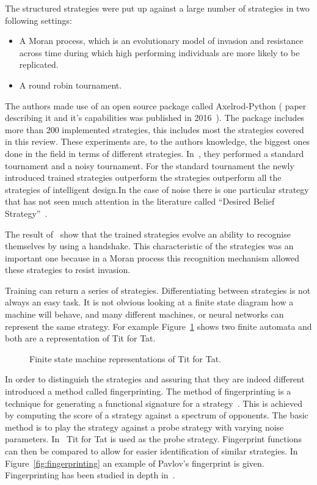 \documentclass{article}
\theoremstyle{definition}
\begin{document}
The structured strategies were put up against a large number of strategies in
two following settings:

\begin{itemize}
    \item A Moran process, which is an evolutionary model of invasion and resistance across
    time during which high performing individuals are more likely to be replicated.
    \item A round robin tournament.
\end{itemize}

The authors made use of an open source package called Axelrod-Python
( paper describing it and it's capabilities was published in 2016~\cite{Knight2016}).
The package includes more than 200 implemented strategies, this includes most
the strategies covered in this review.
These experiments are, to the authors knowledge, the biggest ones done in the
field in terms of different strategies.
In~\cite{Knight2017}, they performed a standard tournament and a noisy tournament.
For the standard tournament the newly introduced trained
strategies outperform the strategies outperform all the strategies of intelligent
design.In the case of noise there is one particular strategy that has not seen much
attention in the literature called ``Desired Belief Strategy''~\cite{Au2006}.

The result of~\cite{KnightHGC17} show that the trained strategies evolve an ability
to recognise themselves by using a handshake. This characteristic of the strategies
was an important one because in a Moran process this recognition mechanism allowed these
strategies to resist invasion.

Training can return a series of strategies. Differentiating between strategies
is not always an easy task. It is not obvious looking at a finite state diagram
how a machine will behave, and many different machines, or neural networks can
represent the same strategy. For example Figure~\ref{fig:machine_tft} shows
two finite automata and both are a representation of Tit for Tat.

\begin{figure}[!hbtp]
    \centering
    
    \caption{Finite state machine representations of Tit for Tat.}\label{fig:machine_tft}
\end{figure}

In order to distinguish the strategies and assuring that they are indeed
different~\cite{Ashlock2005} introduced a method called fingerprinting.
The method of fingerprinting is a technique for generating a functional signature for a
strategy~\cite{Ashlock2008}. This is achieved by computing the score of a strategy
against a spectrum of opponents. The basic method is to play the strategy
against a probe strategy with varying noise parameters. In~\cite{Ashlock2005}
Tit for Tat is used as the probe strategy. Fingerprint functions
can then be compared to allow for easier identification of similar strategies.
In Figure~\ref{fig:fingerprinting} an example of Pavlov's fingerprint is given.
Fingerprinting has been studied in depth in~\cite{Ashlock2008, Ashlock2009,
Ashlock2010, Ashlock2006a}.
\end{document}
